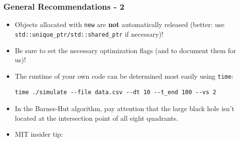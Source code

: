 \begin{frame}[fragile]
    \frametitle{General Recommendations - 2}
    \begin{itemize}
    \item %
    Objects allocated with \texttt{new} are \textbf{not} automatically released (better: use \texttt{std::unique_ptr/std::shared_ptr} if necessary)!
    \item %
    Be sure to set the necessary optimization flags (and to document them for us)!
    \item The runtime of your own code can be determined most easily using \texttt{time}: \\[-.7em]
    {
        \small
        \begin{verbatim}
time ./simulate --file data.csv --dt 10 --t_end 100 --vs 2
        \end{verbatim}
    }%
    \vspace*{-1.75em}
    \item In the Barnes-Hut algorithm, pay attention that the large black hole isn't located at the intersection point of all eight quadrants. 
    \item MIT insider tip: 
    \end{itemize}
\end{frame}


